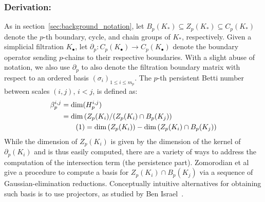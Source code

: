 \documentclass[10pt]{article}
\newcommand{\+}{%
	\raisebox{0.18ex}{\scaleobj{0.55}{+}}
}
\newcommand\numberthis{\addtocounter{equation}{1}\tag{\theequation}}
\begin{document}
\subsubsection*{Derivation:} 
As in section~\ref{sec:background_notation}, let $B_p(K_\ast) \subseteq Z_p(K_\ast) \subseteq C_p(K_\ast)$ denote the $p$-th boundary, cycle, and chain groups of $K_\ast$, respectively. 
Given a simplicial filtration $K_{\bullet}$, let $\partial_p : C_p( K_{\bullet}) \to C_p(K_{\bullet})$ denote the boundary operator sending $p$-chains to their respective boundaries. 
With a slight abuse of notation, we also use $\partial_p$ to also denote the filtration boundary matrix with respect to an ordered basis $(\sigma_i)_{1 \leq i \leq m_p}$.  
The $p$-th persistent Betti number between scales $(i,j)$, $i < j$,  is defined as: 
\begin{align*} \label{eq:pbn}
	\beta_p^{i,j} &= \mathrm{dim}(H_p^{i,j}) \\
	&= \mathrm{dim} \left( Z_p(K_i) / (Z_p(K_i) \cap B_p(K_j) \right) \\
	& \numberthis = \mathrm{dim} \left( Z_p(K_i) \right) - \mathrm{dim}\left( Z_p(K_i) \cap B_p(K_j) \right ) 
\end{align*}
While the dimension of $Z_p(K_i)$ is given by the dimension of the kernel of $\partial_p(K_i)$ and is thus easily computed, there are a variety of ways to address the computation of the intersection term (the persistence part). Zomorodian et al~\cite{} give a procedure to compute a basis for $Z_p(K_i) \cap B_p(K_j)$ via a sequence of Gaussian-elimination reductions. Conceptually intuitive alternatives for obtaining such basis is to use projectors, as studied by Ben Israel~\cite{}. 
\end{document}
